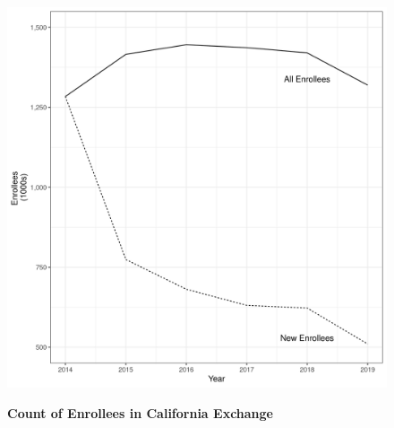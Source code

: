 \documentclass[12pt]{article}
\begin{document}
\newpage
\begin{figure}[htb]
\caption{\textbf{Count of Enrollees in California Exchange}}
\centering
\begin{minipage}[h]{6in}
\centerline{%
    \includegraphics[scale=0.75]{figures/enrollee_count.png}
}
\label{fig:enrollee-count}
\end{minipage}
\end{figure}
\end{document}
